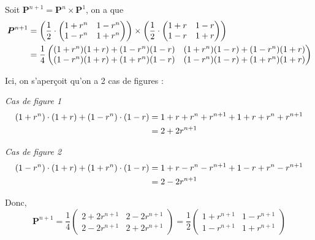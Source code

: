 \documentclass{article}
\begin{document}
    \vspace{.1cm}
    Soit \(\boldsymbol{P}^{n + 1} = \boldsymbol{P}^n \times \boldsymbol{P}^1\), on a que
    \begin{align}
        \boldsymbol{P}^{n + 1} &= \left( \frac{1}{2} \cdot \begin{pmatrix}
            1 + r^n & 1 - r^n \\
            1 - r^n & 1 + r^n
        \end{pmatrix} \right)
        \times
        \left( \frac{1}{2} \cdot \begin{pmatrix}
            1 + r & 1 - r \\ 
            1 - r & 1 + r
        \end{pmatrix} \right) \notag \\ &= 
        \frac{1}{4} \begin{pmatrix}
            (1+r^n)(1+r) + (1-r^n)(1-r) & (1+r^n)(1-r) + (1-r^n)(1+r) \\
            (1-r^n)(1+r) + (1+r^n)(1-r) & (1-r^n)(1-r) + (1+r^n)(1+r)
        \end{pmatrix} \notag
    \end{align}

    Ici, on s'aperçoit qu'on a 2 cas de figures :

    \vspace{.2cm}
    \textit{Cas de figure 1}
    \begin{align}
        (1 + r^n) \cdot (1 + r) + (1 - r^n) \cdot (1 - r) &= 1 + r + r^n + r^{n + 1} + 1 + r + r^n + r^{n + 1} \notag \\
        &= 2 + 2r^{n + 1} \notag
    \end{align}

    \vspace{-.2cm}
    \textit{Cas de figure 2}
    \begin{align}
        (1 - r^n) \cdot (1 + r) + (1 + r^n) \cdot (1 - r) &= 1 + r - r^n - r^{n + 1} + 1 - r + r^n - r^{n + 1} \notag \\
        &= 2 - 2r^{n + 1} \notag
    \end{align}

    \vspace{-.1cm}
    Donc,
    \[
        \boldsymbol{P}^{n + 1} = \frac{1}{4} \begin{pmatrix}
            2 + 2r^{n + 1} & 2 - 2r^{n + 1} \\
            2 - 2r^{n + 1} & 2 + 2r^{n + 1}
        \end{pmatrix}
        = \frac{1}{2} \begin{pmatrix}
            1 + r^{n + 1} & 1 - r^{n + 1} \\
            1 - r^{n + 1} & 1 + r^{n + 1}
        \end{pmatrix}
    \]
    
\end{document}
